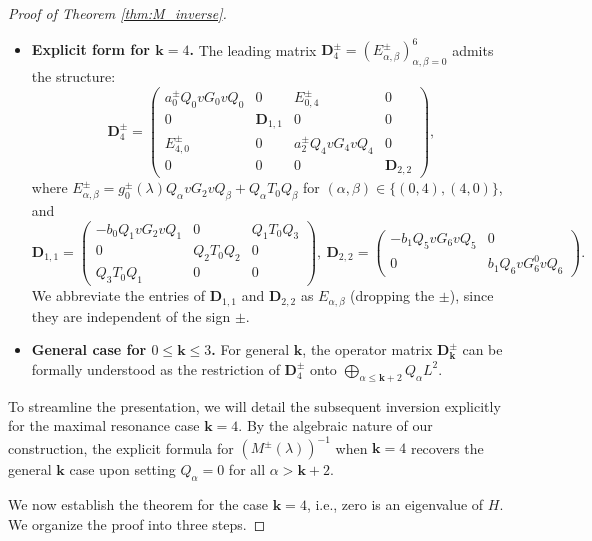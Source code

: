 \documentclass[reqno]{amsart}
\numberwithin{equation}{section}
\begin{document}
\begin{proof}[Proof of Theorem \ref{thm:M_inverse}]
\begin{itemize}
		\item \textbf{Explicit form for $\mathbf{k}=4$.} The leading matrix $\mathbf{D}_{4}^{\pm} = (E_{\alpha, \beta}^{\pm})_{\alpha, \beta=0}^{6}$ admits the structure:
		\begin{equation}\label{D_k}
			\mathbf{D}_{4}^{\pm} =
			\begin{pmatrix}
				a_0^\pm Q_0vG_0vQ_0 & 0 & E_{0,4}^{\pm} & 0 \\
				0 & \mathbf{D}_{1,1} & 0 & 0 \\
				E_{4,0}^{\pm} & 0 & a_2^\pm Q_4vG_4vQ_4 & 0 \\
				0 & 0 & 0 & \mathbf{D}_{2,2}
			\end{pmatrix},
		\end{equation}
		where $E_{\alpha, \beta}^{\pm} = g_0^{\pm}(\lambda) Q_\alpha vG_2 vQ_\beta + Q_\alpha T_0 Q_\beta$ for $(\alpha, \beta) \in \{(0,4), (4,0)\}$, and 
		\begin{equation}\label{D}
			\mathbf{D}_{1,1} = \begin{pmatrix}
				-b_0 Q_1vG_2vQ_1 & 0 & Q_1T_0Q_3 \\
				0 & Q_2T_0Q_2 & 0 \\
				Q_3T_0Q_1 & 0 & 0
			\end{pmatrix}, \
			\mathbf{D}_{2,2} = \begin{pmatrix}
				-b_1 Q_5vG_6vQ_5 & 0 \\
				0 & b_1 Q_6vG_6^0vQ_6
			\end{pmatrix}.
		\end{equation}
		We abbreviate the entries of $\mathbf{D}_{1,1}$ and $\mathbf{D}_{2,2}$ as $E_{\alpha,\beta}$ (dropping the $\pm$), since they are independent of the sign $\pm$.
		
		\item \textbf{General case for $0 \leq \mathbf{k} \leq 3$.}
		For general $\mathbf{k}$, the operator matrix $\mathbf{D}_{\mathbf{k}}^{\pm}$
		can be formally understood as  the restriction of $\mathbf{D}_{4}^{\pm}$ onto $\bigoplus_{\alpha \le \mathbf{k}+2} Q_\alpha L^2$.
	\end{itemize}
	To streamline the presentation, we will detail the subsequent inversion explicitly for the maximal resonance case $\mathbf{k}=4$. By the algebraic nature of our construction, the explicit formula for $(M^{\pm}(\lambda))^{-1}$ when $\mathbf{k}=4$  recovers the general $\mathbf{k}$ case  upon setting $Q_\alpha = 0$ for all $\alpha > \mathbf{k}+2$.
    
	We now establish the theorem for the  case $\mathbf{k}=4$, i.e., zero is an eigenvalue of $H.$  We organize the proof into three steps.


\end{proof}
\end{document}
